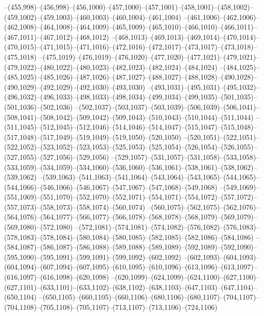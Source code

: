 --(455,998)--(456,998)--(456,1000)--(457,1000)--(457,1001)--(458,1001)--(458,1002)--(459,1002)--(459,1003)--(460,1003)--(460,1004)--(461,1004)
--(461,1006)--(462,1006)--(462,1008)--(464,1008)--(464,1009)--(465,1009)--(465,1010)--(466,1010)--(466,1011)--(467,1011)--(467,1012)--(468,1012)
--(468,1013)--(469,1013)--(469,1014)--(470,1014)--(470,1015)--(471,1015)--(471,1016)--(472,1016)--(472,1017)--(473,1017)--(473,1018)--(475,1018)
--(475,1019)--(476,1019)--(476,1020)--(477,1020)--(477,1021)--(479,1021)--(479,1022)--(480,1022)--(480,1023)--(482,1023)--(482,1024)--(484,1024)
--(484,1025)--(485,1025)--(485,1026)--(487,1026)--(487,1027)--(488,1027)--(488,1028)--(490,1028)--(490,1029)--(492,1029)--(492,1030)--(493,1030)
--(493,1031)--(495,1031)--(495,1032)--(496,1032)--(496,1033)--(498,1033)--(498,1034)--(499,1034)--(499,1035)--(501,1035)--(501,1036)--(502,1036)
--(502,1037)--(503,1037)--(503,1039)--(506,1039)--(506,1041)--(508,1041)--(508,1042)--(509,1042)--(509,1043)--(510,1043)--(510,1044)--(511,1044)
--(511,1045)--(512,1045)--(512,1046)--(514,1046)--(514,1047)--(515,1047)--(515,1048)--(517,1048)--(517,1049)--(519,1049)--(519,1050)--(520,1050)
--(520,1051)--(522,1051)--(522,1052)--(523,1052)--(523,1053)--(525,1053)--(525,1054)--(526,1054)--(526,1055)--(527,1055)--(527,1056)--(529,1056)
--(529,1057)--(531,1057)--(531,1058)--(533,1058)--(533,1059)--(534,1059)--(534,1060)--(536,1060)--(536,1061)--(538,1061)--(538,1062)--(539,1062)
--(539,1063)--(541,1063)--(541,1064)--(543,1064)--(543,1065)--(544,1065)--(544,1066)--(546,1066)--(546,1067)--(547,1067)--(547,1068)--(549,1068)
--(549,1069)--(551,1069)--(551,1070)--(552,1070)--(552,1071)--(554,1071)--(554,1072)--(557,1072)--(557,1073)--(558,1073)--(558,1074)--(560,1074)
--(560,1075)--(562,1075)--(562,1076)--(564,1076)--(564,1077)--(566,1077)--(566,1078)--(568,1078)--(568,1079)--(569,1079)--(569,1080)--(572,1080)
--(572,1081)--(574,1081)--(574,1082)--(576,1082)--(576,1083)--(578,1083)--(578,1084)--(580,1084)--(580,1085)--(582,1085)--(582,1086)--(584,1086)
--(584,1087)--(586,1087)--(586,1088)--(589,1088)--(589,1089)--(592,1089)--(592,1090)--(595,1090)--(595,1091)--(599,1091)--(599,1092)--(602,1092)
--(602,1093)--(604,1093)--(604,1094)--(607,1094)--(607,1095)--(610,1095)--(610,1096)--(613,1096)--(613,1097)--(616,1097)--(616,1098)--(620,1098)
--(620,1099)--(624,1099)--(624,1100)--(627,1100)--(627,1101)--(633,1101)--(633,1102)--(638,1102)--(638,1103)--(647,1103)--(647,1104)--(650,1104)
--(650,1105)--(660,1105)--(660,1106)--(680,1106)--(680,1107)--(704,1107)--(704,1108)--(705,1108)--(705,1107)--(713,1107)--(713,1106)--(724,1106)
